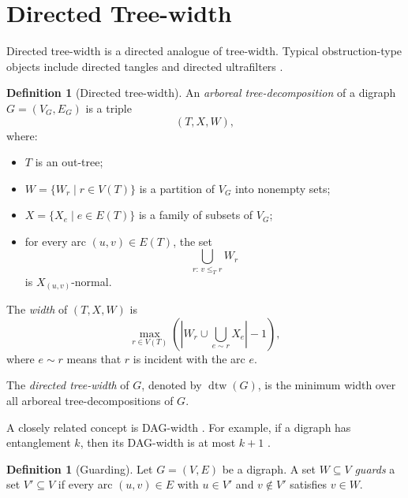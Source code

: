 \documentclass[10pt]{book}
\theoremstyle{definition}
\newtheorem{definition}[theorem]{Definition}
\begin{document}
\section{Directed Tree-width}
Directed tree-width \cite{66,270} is a directed analogue of tree-width.  
Typical obstruction-type objects include directed tangles \cite{72} and directed ultrafilters \cite{12}.

\begin{definition}[Directed tree-width]
\cite{66,270}
An \emph{arboreal tree-decomposition} of a digraph \(G=(V_G,E_G)\) is a triple
\[
(T,X,W),
\]
where:
\begin{itemize}
    \item \(T\) is an out-tree;
    \item \(W=\{W_r\mid r\in V(T)\}\) is a partition of \(V_G\) into nonempty sets;
    \item \(X=\{X_e\mid e\in E(T)\}\) is a family of subsets of \(V_G\);
    \item for every arc \((u,v)\in E(T)\), the set
    \[
    \bigcup_{r:\, v\leq_T r} W_r
    \]
    is \(X_{(u,v)}\)-normal.
\end{itemize}

The \emph{width} of \((T,X,W)\) is
\[
\max_{r\in V(T)}
\left(
|W_r\cup \bigcup_{e\sim r} X_e|-1
\right),
\]
where \(e\sim r\) means that \(r\) is incident with the arc \(e\).

The \emph{directed tree-width} of \(G\), denoted by \(\operatorname{dtw}(G)\), is the minimum width over all arboreal tree-decompositions of \(G\).
\end{definition}

A closely related concept is DAG-width \cite{berwanger2006dag}.  
For example, if a digraph has entanglement \(k\), then its DAG-width is at most \(k+1\) \cite{berwanger2006dag}.

\begin{definition}[Guarding]
\label{def:guards}
\cite{berwanger2006dag}
Let \(G=(V,E)\) be a digraph.  
A set \(W\subseteq V\) \emph{guards} a set \(V'\subseteq V\) if every arc \((u,v)\in E\) with \(u\in V'\) and \(v\notin V'\) satisfies \(v\in W\).
\end{definition}
\end{document}
